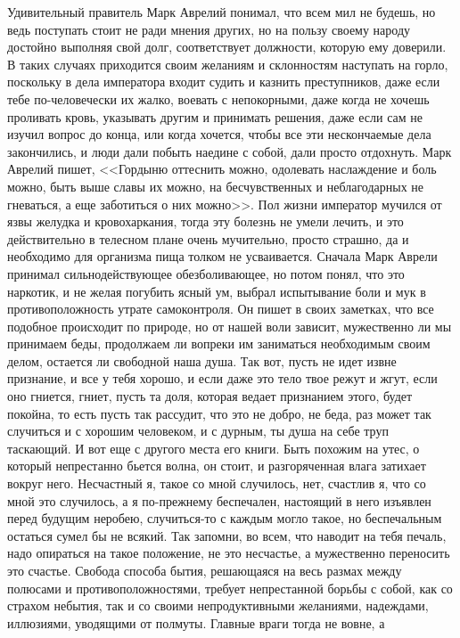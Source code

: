 Удивительный правитель Марк Аврелий понимал, что всем мил не
будешь, но ведь поступать стоит не ради мнения других, но на пользу своему
народу достойно выполняя свой долг, соответствует должности, которую ему
доверили. В таких случаях приходится своим желаниям и склонностям наступать на
горло, поскольку в дела императора входит судить и казнить преступников, даже
если тебе по-человечески их жалко, воевать с непокорными, даже когда не хочешь
проливать кровь, указывать другим и принимать решения, даже если сам не изучил
вопрос до конца, или когда хочется, чтобы все эти нескончаемые дела закончились,
и люди дали побыть наедине с собой, дали просто отдохнуть. Марк Аврелий пишет,
<<Гордыню оттеснить можно, одолевать наслаждение и боль можно, быть выше славы их
можно, на бесчувственных и неблагодарных не гневаться, а еще заботиться о них
можно>>. Пол жизни император мучился от язвы желудка и кровохаркания, тогда эту
болезнь не умели лечить, и это действительно в телесном плане очень мучительно,
просто страшно, да и необходимо для организма пища толком не усваивается.
Сначала Марк Аврели принимал сильнодействующее обезболивающее, но потом понял,
что это наркотик, и не желая погубить ясный ум, выбрал испытывание боли и мук в
противоположность утрате самоконтроля. Он пишет в своих заметках, что все
подобное происходит по природе, но от нашей воли зависит, мужественно ли мы
принимаем беды, продолжаем ли вопреки им заниматься необходимым своим делом,
остается ли свободной наша душа. Так вот, пусть не идет извне признание, и все у
тебя хорошо, и если даже это тело твое режут и жгут, если оно гниется, гниет,
пусть та доля, которая ведает признанием этого, будет покойна, то есть пусть так
рассудит, что это не добро, не беда, раз может так случиться и с хорошим
человеком, и с дурным, ты душа на себе труп таскающий. И вот еще с другого места
его книги. Быть похожим на утес, о который непрестанно бьется волна, он стоит, и
разгоряченная влага затихает вокруг него. Несчастный я, такое со мной случилось,
нет, счастлив я, что со мной это случилось, а я по-прежнему беспечален,
настоящий в него изъявлен перед будущим неробею, случиться-то с каждым могло
такое, но беспечальным остаться сумел бы не всякий. Так запомни, во всем, что
наводит на тебя печаль, надо опираться на такое положение, не это несчастье, а
мужественно переносить это счастье. Свобода способа бытия, решающаяся на весь
размах между полюсами и противоположностями, требует непрестанной борьбы с
собой, как со страхом небытия, так и со своими непродуктивными желаниями,
надеждами, иллюзиями, уводящими от полмуты. Главные враги тогда не вовне, а
